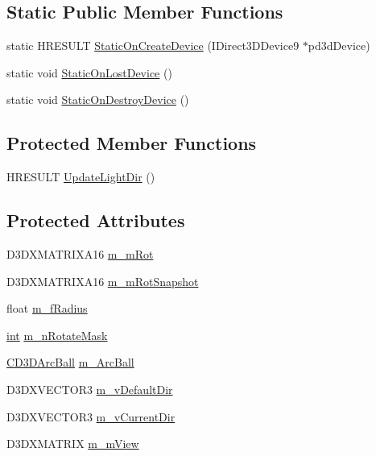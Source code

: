 \subsection*{Static Public Member Functions}
\begin{DoxyCompactItemize}
\item 
static HRESULT \hyperlink{class_c_d_x_u_t_direction_widget_ad35c008e4e109f6a79a2b88008a8a614}{StaticOnCreateDevice} (IDirect3DDevice9 $\ast$pd3dDevice)
\item 
static void \hyperlink{class_c_d_x_u_t_direction_widget_a22263fd07ccf18a43ffe2cfef4622eaf}{StaticOnLostDevice} ()
\item 
static void \hyperlink{class_c_d_x_u_t_direction_widget_af4ba68513e65724768131c2cc8ff06fa}{StaticOnDestroyDevice} ()
\end{DoxyCompactItemize}
\subsection*{Protected Member Functions}
\begin{DoxyCompactItemize}
\item 
HRESULT \hyperlink{class_c_d_x_u_t_direction_widget_a35dd2b18e3169755c5d13cb4b8da8ec6}{UpdateLightDir} ()
\end{DoxyCompactItemize}
\subsection*{Protected Attributes}
\begin{DoxyCompactItemize}
\item 
D3DXMATRIXA16 \hyperlink{class_c_d_x_u_t_direction_widget_acd8ea6dfee9ad0593f1dc33a9c6b27ba}{m\_\-mRot}
\item 
D3DXMATRIXA16 \hyperlink{class_c_d_x_u_t_direction_widget_a7f48a9c9e0aecffeb01cfbbad4e2736c}{m\_\-mRotSnapshot}
\item 
float \hyperlink{class_c_d_x_u_t_direction_widget_a038de5f37cfd414d3abaa1f841d74235}{m\_\-fRadius}
\item 
\hyperlink{_d_x_u_tgui_8cpp_a2d77ed03302b6978834ee3b6f57837fb}{int} \hyperlink{class_c_d_x_u_t_direction_widget_a949513e0f0d9c14a68b734019244bafc}{m\_\-nRotateMask}
\item 
\hyperlink{class_c_d3_d_arc_ball}{CD3DArcBall} \hyperlink{class_c_d_x_u_t_direction_widget_a36404bb48b163d884cef2f72dfa05d2c}{m\_\-ArcBall}
\item 
D3DXVECTOR3 \hyperlink{class_c_d_x_u_t_direction_widget_a856d335ef4da33a0e9e2e0eed0cf3d04}{m\_\-vDefaultDir}
\item 
D3DXVECTOR3 \hyperlink{class_c_d_x_u_t_direction_widget_a2e519446bb939006632aeeb310ae2405}{m\_\-vCurrentDir}
\item 
D3DXMATRIX \hyperlink{class_c_d_x_u_t_direction_widget_afb92062e4b1ce5678298d653cbe3775c}{m\_\-mView}
\end{DoxyCompactItemize}
